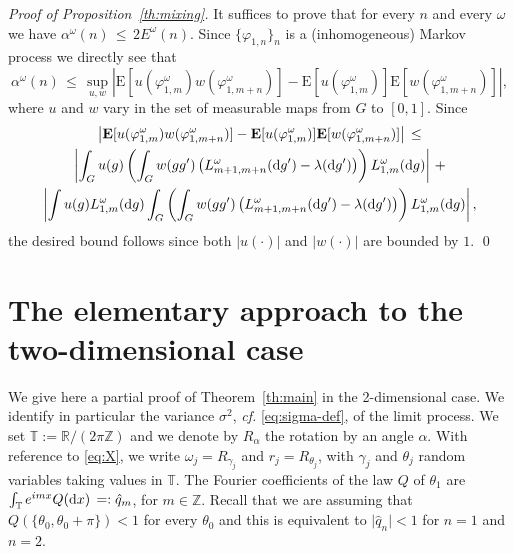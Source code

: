 \documentclass[a4paper,reqno,11pt]{amsart}
\numberwithin{equation}{section}
\newcommand{\bbT}{{\ensuremath{\mathbb T}} }
\newcommand{\ga}{\alpha}
\newcommand{\gl}{\lambda}
\newcommand{\gs}{\sigma}
\newcommand{\go}{\omega}
\newcommand{\dd}{\text{\rm d}}             %
\newcommand{\R}{\mathbb{R}}
\newcommand{\Z}{\mathbb{Z}}
\def\bE{\ensuremath{\bs{\mathrm{E}}}}
\def\bs{\boldsymbol}
\renewcommand{\phi}{\varphi}
\begin{document}
\bigskip

\noindent
{\it Proof of Proposition~\ref{th:mixing}.}
It suffices to prove that for every $n$ and every $\go$ we have
$\ga^\go (n) \, \le \,  2E^\go (n) $.
Since $\{\phi_{1,n}\}_{n}$ is a (inhomogeneous) Markov process
we directly see that
\begin{equation}
    \ga^\go (n) \,\le \,
    \sup_{u,w}  \left|\bE [u(\phi^\go_{1,m})w(\phi^\go_{1,m+n})]
    -\bE [u(\phi^\go_{1,m})]\bE[w(\phi^\go_{1,m+n})]
    \right|,
\end{equation}
where  $u$ and $w$ vary in the set of  measurable maps from
$G$ to $[0,1]$. Since
\begin{multline}
\left|\bE [u(\phi^\go_{1,m})w(\phi^\go_{1,m+n})]
    -\bE [u(\phi^\go_{1,m})]\bE[w(\phi^\go_{1,m+n})]
    \right|\, \le \\
    \left\vert
 \int_{G} u(g)\left(\int_G w(gg^\prime) \left(L_{m+1,m+n}^\go (\dd g^\prime)
   -\gl (\dd g^\prime)\right)\right) L_{1,m}^\go (\dd g)
    \right\vert \,+\\
     \left\vert
     \int u(g) L_{1, m}^\go (\dd g)
 \int_{G} \left(\int_G w(gg^\prime) \left(L_{m+1,m+n}^\go (\dd g^\prime)
   -\gl (\dd g^\prime)\right)\right) L_{1,m}^\go (\dd g)
    \right\vert
   ,
\end{multline}
the desired bound follows since both $\vert u(\cdot)\vert$ and $\vert w(\cdot)\vert$
are bounded by $1$.
\qed


\bigskip

\appendix



\medskip

\section{The elementary approach to the two-dimensional case}

\label{sec:2d}
We give here a partial proof of Theorem~\ref{th:main} in the 2-dimensional case. We identify in particular
the variance $\gs^2$, {\sl cf.} \eqref{eq:sigma-def}, of the limit process.
We set $\bbT := \R/(2\pi\Z)$ and we denote by $R_\ga$
the rotation by an angle $\ga$. With reference to \eqref{eq:X}, we write
$\go_j=R_{\gamma_j}$ and $r_j=R_{\theta_j}$, with $\gamma_j$ and
$\theta_j$ random variables taking values in $\bbT$.
The Fourier coefficients of the law $Q$ of $\theta_1$ are
$\int_\bbT e^{i m x} Q (\dd x)\, =: \hat{q}_m$,
for $m\in\Z$. Recall that we are assuming that $Q(\{\theta_0, \theta_0+\pi\})<1$
for every $\theta_0$
and this is equivalent to $\vert \hat{q}_n\vert <1$ for $n=1$ and $n=2$.
\end{document}
